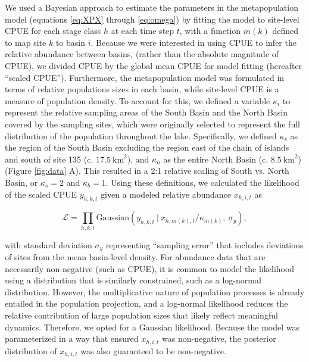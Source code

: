 \documentclass[11pt]{article}
\begin{document}
We used a Bayesian approach to estimate the parameters in the metapopulation model
(equations \ref{eq:XPX} through \ref{eq:omega}) by fitting the model to site-level
CPUE for each stage class $h$ at each time step $t$,
with a function $m(k)$ defined to map site $k$ to basin $i$.
Because we were interested in using CPUE to infer the relative abundance between basins,
(rather than the absolute magnitude of CPUE), 
we divided CPUE by the global mean CPUE for model fitting (hereafter ``scaled CPUE''). 
Furthermore, the metapopulation model was formulated in terms of 
relative populations sizes in each basin,
while site-level CPUE is a measure of population density.
To account for this, we defined a variable $\kappa_i$ to represent the relative 
sampling areas of the South Basin and the North Basin covered by the sampling sites,
which were originally selected to represent the full distribution 
of the population throughout the lake.
Specifically, we defined $\kappa_s$ as the region of the South Basin excluding the region 
east of the chain of islands and south of site 135 (c. $17.5~\textrm{km}^2$),
and $\kappa_n$ as the entire North Basin (c. $8.5~\textrm{km}^2$) (Figure \ref{fig:data} A).
This resulted in a 2:1 relative scaling of South vs. North Basin,
or $\kappa_s = 2$ and $\kappa_b = 1$.
Using these definitions, we calculated the likelihood of the scaled CPUE $y_{h,k,t}$
given a modeled relative abundance $x_{h,i,t}$ as
%
\begin{linenomath*}
\begin{equation} \label{eq:likelihood}
\mathcal{L} = 
\displaystyle\prod_{h,k,t}
\textrm{Gaussian}
    \left(
        y_{h,k,t}~|~x_{h,m(k),t} / \kappa_{m(k)},~\sigma_y
    \right),
\end{equation}
\end{linenomath*}
%
with standard deviation $\sigma_y$ representing ``sampling error'' 
that includes deviations of sites from the mean basin-level density.
For abundance data that are necessarily non-negative (such as CPUE), 
it is common to model the likelihood using a distribution that is similarly constrained,
such as a log-normal distribution. 
However, the multiplicative nature of population processes is already entailed 
in the population projection, 
and a log-normal likelihood reduces the relative contribution of large population sizes
that likely reflect meaningful dynamics.
Therefore, we opted for a Gaussian likelihood. 
Because the model was parameterized in a way that ensured
$x_{h,i,t}$ was non-negative,
the posterior distribution of $x_{h,i,t}$ was also guaranteed to be non-negative. 
\end{document}
